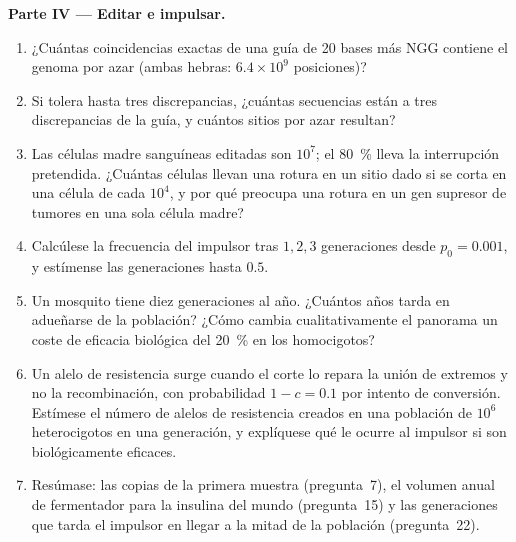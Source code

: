\begin{problem}
\medskip
\noindent\textbf{Parte IV --- Editar e impulsar.}
\begin{enumerate}[resume]
  \item ¿Cuántas coincidencias exactas de una guía de 20 bases más NGG
        contiene el genoma por azar (ambas hebras: $6.4\times 10^{9}$
        posiciones)?
  \item Si  tolera hasta tres discrepancias, ¿cuántas secuencias
        están a tres discrepancias de la guía, y cuántos sitios  por azar resultan?
  \item Las células madre sanguíneas editadas son $10^{7}$; el
        \qty{80}{\%} lleva la interrupción pretendida. ¿Cuántas células
        llevan una rotura  en un sitio dado si se corta en
        una célula de cada $10^{4}$, y por qué preocupa una rotura en un
        gen supresor de tumores en una sola célula madre?
  \item Calcúlese la frecuencia del impulsor tras $1, 2, 3$
        generaciones desde $p_{0} = 0.001$, y estímense las generaciones
        hasta $0.5$.
  \item Un mosquito tiene diez generaciones al año. ¿Cuántos años tarda
        en adueñarse de la población? ¿Cómo cambia cualitativamente el
        panorama un coste de eficacia biológica del \qty{20}{\%} en los
        homocigotos?
  \item Un alelo de resistencia surge cuando el corte lo repara la unión
        de extremos y no la recombinación, con probabilidad $1 - c = 0.1$
        por intento de conversión. Estímese el número de alelos de
        resistencia creados en una población de $10^{6}$ heterocigotos en
        una generación, y explíquese qué le ocurre al impulsor si son
        biológicamente eficaces.
  \item Resúmase: las copias de la primera muestra (pregunta~7), el
        volumen anual de fermentador para la insulina del mundo
        (pregunta~15) y las generaciones que tarda el impulsor en llegar
        a la mitad de la población (pregunta~22).
\end{enumerate}
\end{problem}
